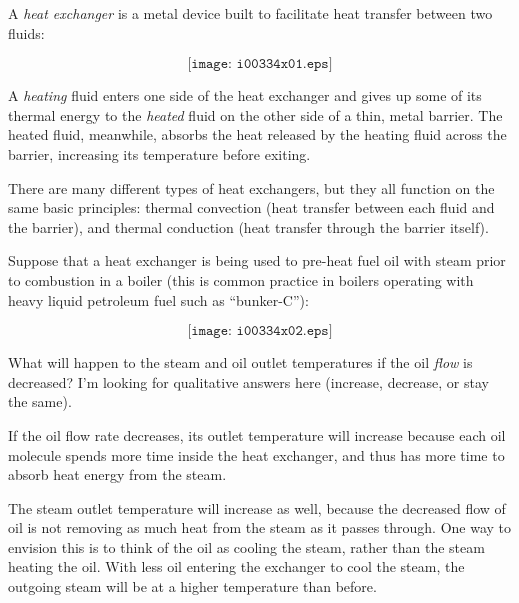 

A {\it heat exchanger} is a metal device built to facilitate heat transfer between two fluids:

$$\texttt{[image: i00334x01.eps]}$$

A {\it heating} fluid enters one side of the heat exchanger and gives up some of its thermal energy to the {\it heated} fluid on the other side of a thin, metal barrier.  The heated fluid, meanwhile, absorbs the heat released by the heating fluid across the barrier, increasing its temperature before exiting.

There are many different types of heat exchangers, but they all function on the same basic principles: thermal convection (heat transfer between each fluid and the barrier), and thermal conduction (heat transfer through the barrier itself). 

Suppose that a heat exchanger is being used to pre-heat fuel oil with steam prior to combustion in a boiler (this is common practice in boilers operating with heavy liquid petroleum fuel such as ``bunker-C''):

$$\texttt{[image: i00334x02.eps]}$$

What will happen to the steam and oil outlet temperatures if the oil {\it flow} is decreased?  I'm looking for qualitative answers here (increase, decrease, or stay the same).








If the oil flow rate decreases, its outlet temperature will increase because each oil molecule spends more time inside the heat exchanger, and thus has more time to absorb heat energy from the steam.  

The steam outlet temperature will increase as well, because the decreased flow of oil is not removing as much heat from the steam as it passes through.  One way to envision this is to think of the oil as cooling the steam, rather than the steam heating the oil.  With less oil entering the exchanger to cool the steam, the outgoing steam will be at a higher temperature than before.











